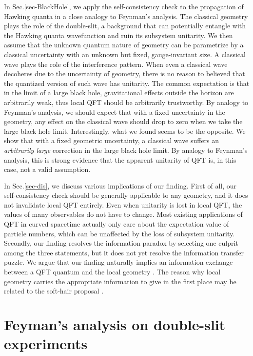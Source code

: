 \documentclass[aps,showpacs,onecolumn,floats,prd,superscriptaddress,nofootinbib]{revtex4-1}
\begin{document}
In Sec.\ref{sec-BlackHole}, we apply the self-consistency check to the propagation of Hawking quanta in a close analogy to Feynman's analysis. 
The classical geometry plays the role of the double-slit, a background that can potentially entangle with the Hawking quanta wavefunction and ruin its subsystem unitarity. 
We then assume that the unknown quantum nature of geometry can be parametrize by a classical uncertainty with an unknown but fixed, gauge-invariant size. 
A classical wave plays the role of the interference pattern. 
When even a classical wave decoheres due to the uncertainty of geometry, there is no reason to believed that the quantized version of such wave has unitarity.
The common expectation is that in the limit of a large black hole, gravitational effects outside the horizon are arbitrarily weak, thus local QFT should be arbitrarily trustworthy.
By analogy to Feynman's analysis, we should expect that with a fixed uncertainty in the geometry, any effect on the classical wave should drop to zero when we take the large black hole limit.
Interestingly, what we found seems to be the opposite. 
We show that with a fixed geometric uncertainty, a classical wave suffers an {\it arbitrarily large} correction in the large black hole limit.
By analogy to Feynman's analysis, this is strong evidence that the apparent unitarity of QFT is, in this case, not a valid assumption.

In Sec.\ref{sec-dis}, we discuss various implications of our finding. 
First of all, our self-consistency check should be generally applicable to any geometry, and it does not invalidate local QFT entirely. 
Even when unitarity is lost in local QFT, the values of many observables do not have to change. 
Most existing applications of QFT in curved spacetime actually only care about the expectation value of particle numbers, which can be unaffected by the loss of subsystem unitarity. 
Secondly, our finding resolves the information paradox by selecting one culprit among the three statements, but it does not yet resolve the information transfer puzzle. 
We argue that our finding naturally implies an information exchange between a QFT quantum and the local geometry \cite{OsuPag16}.
The reason why local geometry carries the appropriate information to give in the first place may be related to the soft-hair proposal \cite{HawPer16}. 

\section{Feyman's analysis on double-slit experiments}
\label{sec-DoubleSlit}
\end{document}
